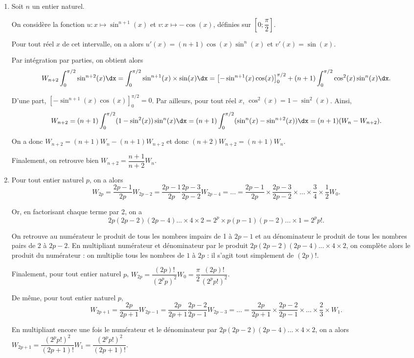 \documentclass[11pt,fleqn, openany]{book} %
\begin{document}
\begin{solution}
\begin{enumerate}
\item Soit $n$ un entier naturel. 

On considère la fonction $u :x \mapsto \sin^{n+1}(x)$ et $v:x\mapsto -\cos(x)$, définies sur $\left[0;\dfrac{\pi}{2}\right]$. 

Pour tout réel $x$ de cet intervalle, on a alors $u'(x)=(n+1)\cos(x)\sin^n(x)$ et $v'(x)=\sin(x)$. 

Par intégration par parties, on obtient alors
\[W_{n+2}\int_0^{\pi/2} \sin^{n+2}(x)\dx = \int_0^{\pi/2} \sin^{n+1}(x) \times \sin(x) \dx = \left[-\sin^{n+1}(x)\cos(x)\right]_0^{\pi/2}+(n+1)\int_0^{\pi/2}\cos^2(x)\sin^n(x)\dx.\]

D'une part, $\left[-\sin^{n+1}(x)\cos(x)\right]_0^{\pi/2}=0$. Par ailleurs, pour tout réel $x$, $\cos^2(x)=1-\sin^2(x)$. Ainsi,
\[W_{n+2}=(n+1)\int_0^{\pi/2}(1-\sin^2(x))\sin^n(x)\dx = (n+1)\int_0^{\pi/2}(\sin^n(x)-\sin^{n+2}(x))\dx = (n+1)(W_n-W_{n+2}).\]

On a donc $W_{n+2}=(n+1)W_n-(n+1)W_{n+2}$ et donc $(n+2)W_{n+2}=(n+1)W_n$.

Finalement, on retrouve bien $W_{n+2}=\dfrac{n+1}{n+2}W_n$.

\item Pour tout entier naturel $p$, on a alors
\[W_{2p}=\dfrac{2p-1}{2p}W_{2p-2}=\dfrac{2p-1}{2p}\dfrac{2p-3}{2p-2}W_{2p-4}= \dots =\dfrac{2p-1}{2p} \times \dfrac{2p-3}{2p-2} \times \dots \times \dfrac{3}{4} \times \dfrac{1}{2} W_0.\]

Or, en factorisant chaque terme par 2, on a \[2p(2p-2)(2p-4)...\times 4 \times 2=2^p \times p(p-1)(p-2)... \times 1 = 2^pp!.\]

On retrouve au numérateur le produit de tous les nombres impairs de 1 à $2p-1$ et au dénominateur le produit de tous les nombres pairs de 2 à $2p-2$.
En multipliant numérateur et dénominateur par le produit $2p(2p-2)(2p-4)...\times 4 \times 2$, on complète alors le produit du numérateur : on multiplie tous les nombres de $1$ à $2p$ : il s'agit tout simplement de $(2p)!$.

Finalement, pour tout entier naturel $p$, $W_{2p}=\dfrac{(2p)!}{(2^pp)^2}W_0 = \dfrac{\pi}{2}\dfrac{(2p)!}{(2^pp!)^2}$. 

De même, pour tout entier naturel $p$,
\[W_{2p+1}=\dfrac{2p}{2p+1}W_{2p-1}=\dfrac{2p}{2p+1}\dfrac{2p-2}{2p-1}W_{2p-3}= \dots =\dfrac{2p}{2p+1} \times \dfrac{2p-2}{2p-1} \times \dots \times \dfrac{2}{3} \times W_1.\]

En multipliant encore une fois le numérateur et le dénominateur par $2p(2p-2)(2p-4)...\times 4 \times 2$, on a alors $W_{2p+1}=\dfrac{(2^pp!)^2}{(2p+1)!}W_1=\dfrac{(2^pp!)^2}{(2p+1)!}$.


\end{enumerate}
\end{solution}
\end{document}
